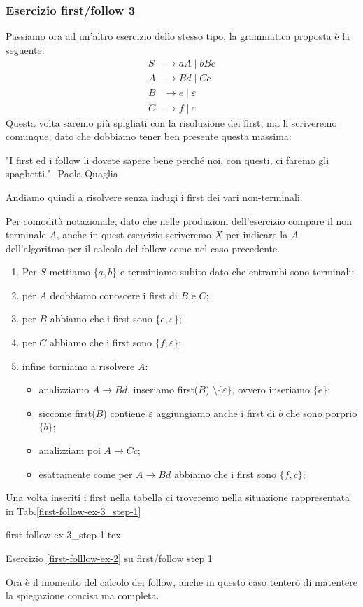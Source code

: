 \documentclass[class=book, crop=false, oneside, 12pt]{standalone}
\begin{document}
\subsubsection{Esercizio first/follow 3}
\label{first-folllow-ex-3}
Passiamo ora ad un'altro esercizio dello stesso tipo, la grammatica proposta è la seguente:
\begin{align*}
    S &\to aA \mid bBc \\
    A &\to Bd \mid Cc \\
    B &\to e \mid \varepsilon \\
    C &\to f \mid \varepsilon
\end{align*}
Questa volta saremo più spigliati con la risoluzione dei first, ma li scriveremo comunque, dato che dobbiamo tener ben presente questa massima:
\begin{displayquote}
    "I first ed i follow li dovete sapere bene perché noi, con questi, ci faremo gli spaghetti."
    -Paola Quaglia
\end{displayquote}

\noindent Andiamo quindi a risolvere senza indugi i first dei vari non-terminali.

Per comodità notazionale, dato che nelle produzioni dell'esercizio compare il non terminale \(A\), anche in quest esercizio scriveremo \(X\) per indicare la \(A\) dell'algoritmo per il calcolo del follow come nel caso precedente.
\begin{enumerate}
    \item Per \(S\) mettiamo \(\{a, b\}\) e terminiamo subito dato che entrambi sono terminali;
    \item per \(A\) deobbiamo conoscere i first di \(B\) e \(C\);
    \item per \(B\) abbiamo che i first sono \(\{e, \varepsilon\}\);
    \item per \(C\) abbiamo che i first sono \(\{f, \varepsilon\}\);
    \item infine torniamo a risolvere \(A\):
    \begin{itemize}
        \item analizziamo \(A \to Bd\), inseriamo first(\(B\)) \(\setminus \{\varepsilon\}\), ovvero inseriamo \(\{e\}\);
        \item siccome first(\(B\)) contiene \(\varepsilon\) aggiungiamo anche i first di \(b\) che sono porprio \(\{b\}\);
        \item analizziam poi \(A \to Cc\);
        \item esattamente come per \(A \to Bd\) abbiamo che i first sono \(\{f, c\}\);
    \end{itemize}
\end{enumerate}
Una volta inseriti i first nella tabella ci troveremo nella situazione rappresentata in Tab.\ref{first-follow-ex-3_step-1}
\begin{table}[H]
	\centering
	{first-follow-ex-3_step-1.tex}
    \caption{Esercizio \ref{first-folllow-ex-2} su first/follow step 1}
    \label{first-follow-ex-3_step-1}
\end{table}
Ora è il momento del calcolo dei follow, anche in questo caso tenterò di matentere la spiegazione concisa ma completa.
\end{document}
